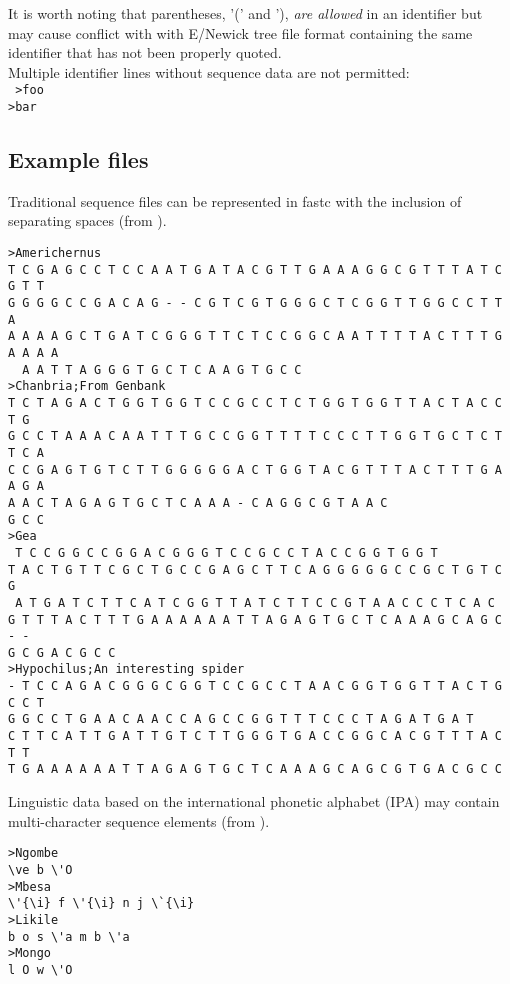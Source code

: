 \documentclass[12pt]{article}
\begin{document}
It is worth noting that parentheses, '(' and '), \textit{are allowed} in an identifier but may cause conflict with with E/Newick tree file format \citep{Cardonaetal2008} containing the same identifier that has not been properly quoted. \\

Multiple identifier lines without sequence data  are not permitted:\\
\texttt{	
>foo\\
>bar\\
}


\subsection{Example files}
Traditional sequence files can be represented in fastc with the inclusion of separating spaces (from \citealp{Wheeler1998c}).
\singlespace
\begin{verbatim}
>Americhernus      
T C G A G C C T C C A A T G A T A C G T T G A A A G G C G T T T A T C G T T 
G G G G C C G A C A G - - C G T C G T G G G C T C G G T T G G C C T T A 
A A A A G C T G A T C G G G T T C T C C G G C A A T T T T A C T T T G A A A A
  A A T T A G G G T G C T C A A G T G C C 
>Chanbria;From Genbank
T C T A G A C T G G T G G T C C G C C T C T G G T G G T T A C T A C C T G 
G C C T A A A C A A T T T G C C G G T T T T C C C T T G G T G C T C T T C A 
C C G A G T G T C T T G G G G G A C T G G T A C G T T T A C T T T G A A G A 
A A C T A G A G T G C T C A A A - C A G G C G T A A C
G C C 
>Gea
 T C C G G C C G G A C G G G T C C G C C T A C C G G T G G T 
T A C T G T T C G C T G C C G A G C T T C A G G G G G C C G C T G T C G 
 A T G A T C T T C A T C G G T T A T C T T C C G T A A C C C T C A C 
G T T T A C T T T G A A A A A A T T A G A G T G C T C A A A G C A G C - -
G C G A C G C C 
>Hypochilus;An interesting spider
- T C C A G A C G G G C G G T C C G C C T A A C G G T G G T T A C T G C C T 
G G C C T G A A C A A C C A G C C G G T T T C C C T A G A T G A T 
C T T C A T T G A T T G T C T T G G G T G A C C G G C A C G T T T A C T T
T G A A A A A A T T A G A G T G C T C A A A G C A G C G T G A C G C C 
 \end{verbatim}
 \doublespace
Linguistic data based on the international phonetic alphabet (IPA) may contain multi-character sequence elements
(from \citealp{Whiteleyetal2019}).
\singlespace
\begin{verbatim}
>Ngombe
\ve b \'O
>Mbesa
\'{\i} f \'{\i} n j \`{\i}
>Likile
b o s \'a m b \'a
>Mongo
l O w \'O
\end{verbatim}
\end{document}
